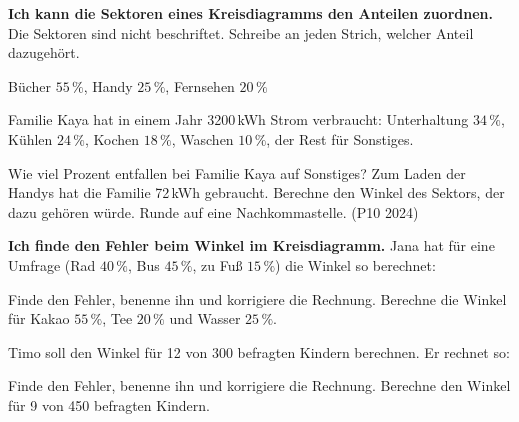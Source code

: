 \begin{aufgabe}{\textbf{Ich kann die Sektoren eines Kreisdiagramms den Anteilen zuordnen.} Die Sektoren sind nicht beschriftet. Schreibe an jeden Strich, welcher Anteil dazugehört.}
\noindent\begin{minipage}[t]{0.40\linewidth}
\begin{teile}
\teil Bücher $55\,\%$, Handy $25\,\%$, Fernsehen $20\,\%$
\end{teile}
\end{minipage}\hfill
\begin{minipage}[t]{0.56\linewidth}
\begin{teile}
\teil Familie Kaya hat in einem Jahr 3200\,kWh Strom verbraucht: Unterhaltung $34\,\%$, Kühlen $24\,\%$, Kochen $18\,\%$, Waschen $10\,\%$, der Rest für Sonstiges.
\end{teile}
\end{minipage}
\begin{teile}
\teil Wie viel Prozent entfallen bei Familie Kaya auf Sonstiges? \leerfeld[\%]
\teil Zum Laden der Handys hat die Familie 72\,kWh gebraucht. Berechne den Winkel des Sektors, der dazu gehören würde. Runde auf eine Nachkommastelle. (P10 2024)\\ \leerfeld[$^\circ$]
\end{teile}
\end{aufgabe}

\begin{aufgabe}{\textbf{Ich finde den Fehler beim Winkel im Kreisdiagramm.} Jana hat für eine Umfrage (Rad $40\,\%$, Bus $45\,\%$, zu Fuß $15\,\%$) die Winkel so berechnet:}
\begin{teile}
\teil Finde den Fehler, benenne ihn und korrigiere die Rechnung.
\teil Berechne die Winkel für Kakao $55\,\%$, Tee $20\,\%$ und Wasser $25\,\%$.
\end{teile}
Timo soll den Winkel für 12 von 300 befragten Kindern berechnen. Er rechnet so:
\begin{teile}
\teil Finde den Fehler, benenne ihn und korrigiere die Rechnung.
\teil Berechne den Winkel für 9 von 450 befragten Kindern. \leerfeld[$^\circ$]
\end{teile}
\end{aufgabe}

